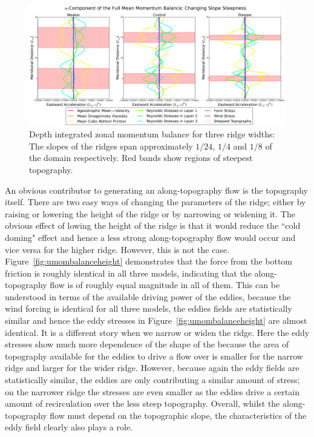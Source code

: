 \documentclass[12pt,a4paper]{report}
\newcommand*\figref[1]{Figure~\ref{#1}}
\begin{document}
  \begin{figure}
  	\centering
  	\includegraphics[width=\linewidth]{umom_3_4}
  	\caption{ Depth integrated zonal momentum balance for three ridge widths: 
  		The slopes of the ridges span approximately $1/24$, $1/4$ and $1/8$
  		of the domain respectively. Red bands show regions of steepest topography.}
  	\label{fig:umombalancewidth}
  \end{figure}
    
  An obvious contributor to generating an along-topography flow is the topography
  itself. There are two easy ways of changing the parameters of the ridge; either
  by raising or lowering the height of the ridge or by narrowing or widening it. 
  The obvious effect of lowing the height of the ridge is that it would reduce the 
  ``cold doming" effect and hence a less strong along-topography flow would occur
  and vice versa for the higher ridge. 
  However, this is not the case. \figref{fig:umombalanceheight} demonstrates that
  the force from the bottom friction is roughly identical in all three models, 
  indicating that the along-topography flow is of roughly equal magnitude in all of them.
  This can be understood in terms of the available driving power of the eddies,
  because the wind forcing is identical for all three models, the eddies fields
  are statistically similar and hence the eddy stresses in \figref{fig:umombalanceheight}
  are almost identical. It is a different story when we narrow or widen the ridge.
  Here the eddy stresses show much more dependence of the shape of the because
  the area of topography available for the eddies to drive a flow over is smaller 
  for the narrow ridge and larger for the wider ridge. However, because again the
  eddy fields are statistically similar, the eddies are only contributing 
  a similar amount of stress; on the narrower ridge the stresses are even smaller
  as the eddies drive a certain amount of recirculation over the less steep topography.
  Overall, whilst the along-topography flow must depend on the topographic slope,
  the characteristics of the eddy field clearly also plays a role.
  
\end{document}
